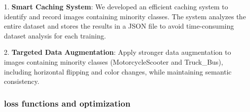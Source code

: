 \documentclass[conference]{IEEEtran}
\begin{document}
    
    
1. \textbf{Smart Caching System}: We developed an efficient caching system to identify and record images containing minority classes. The system analyzes the entire dataset and stores the results in a JSON file to avoid time-consuming dataset analysis for each training.

2. \textbf{Targeted Data Augmentation}: Apply stronger data augmentation to images containing minority classes (MotorcycleScooter and Truck\_Bus), including horizontal flipping and color changes, while maintaining semantic consistency.


\subsubsection{loss functions and optimization}





        
        
\end{document}
